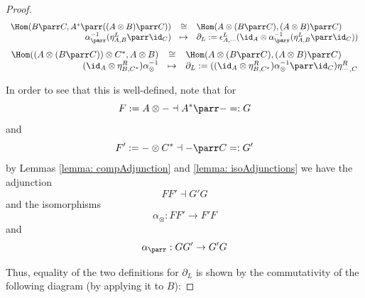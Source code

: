 \documentclass[DIN, pagenumber=false, fontsize=11pt, parskip=half, colorinlistoftodos, svgnames]{scrartcl}
\begin{document}
\begin{proof}
		\begin{equation*}
			\begin{array}{rcl}
					\Hom(B \parr C, A^* \parr ((A \otimes B) \parr C)) 
					& \cong &
					\Hom(A \otimes (B \parr C) , (A \otimes B) \parr C)
				\\
					\alpha_\parr^{-1}(\eta^L_{A,B} \parr \id_C)
					& \mapsto &
					\partial_L := \epsilon^L_{A, \cdots} ( \id_A \otimes \alpha_\parr^{-1}(\eta^L_{A,B} \parr \id_C) )
			\end{array}
		\end{equation*}
		\begin{equation*}
			\begin{array}{rcl}
					\Hom((A \otimes (B \parr C))\otimes C^*, A \otimes B)
					& \cong &
					\Hom(A \otimes (B \parr C) , (A \otimes B) \parr C)
				\\
					(\id_A \otimes \eta^R_{B, C^*} ) \alpha_\otimes^{-1}
					& \mapsto &
					\partial_L := ((\id_A \otimes \eta^R_{B, C^*} ) \alpha_\otimes^{-1} \parr \id_C) \eta^R_{\cdots, C}
			\end{array}
		\end{equation*}
		
		In order to see that this is well-defined, note that for 
		\begin{equation*}
			F:= A\otimes - \dashv A^* \parr - =: G
		\end{equation*} 
		and 
		\begin{equation*}
			F':= - \otimes C^* \dashv - \parr C =: G'
		\end{equation*} 
		by Lemmas \ref{lemma: compAdjunction} and \ref{lemma: isoAdjunctions} we have the adjunction 
		\begin{equation*}
			F F' \dashv G' G
		\end{equation*} 
		and the isomorphisms
		\begin{equation*}
			\alpha_\otimes : F F' \rightarrow F' F
		\end{equation*} 
		and 
		\begin{equation*}
			\alpha_\parr : G G' \rightarrow G' G 
		\end{equation*}
		
		Thus, equality of the two definitions for $\partial_L$ is shown by the commutativity of the following diagram (by applying it to $B$):
		

\end{proof}
\end{document}
